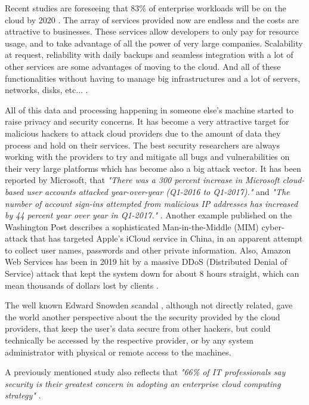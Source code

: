 Recent studies are foreseeing that 83{\%} of enterprise workloads will be on the cloud by 2020 \cite{cloud_statistic:1}. The array of services provided now are endless and the costs are attractive to businesses. These services allow developers to only pay for resource usage, and to take advantage of all the power of very large companies. Scalability at request, reliability with daily backups and seamless integration with a lot of other services are some advantages of moving to the cloud. And all of these functionalities without having to manage big infrastructures and a lot of servers, networks, disks, etc... \cite{cloud_benefits:1}.

All of this data and processing happening in someone else's machine started to raise privacy and security concerns. It has become a very attractive target for malicious hackers to attack cloud providers due to the amount of data they process and hold on their services. The best security researchers are always working with the providers to try and mitigate all bugs and vulnerabilities on their very large platforms which has become also a big attack vector. It has been reported by Microsoft, that \textit{"There was a 300 percent increase in Microsoft cloud-based user accounts attacked year-over-year (Q1-2016 to Q1-2017)."} and \textit{"The number of account sign-ins attempted from malicious IP addresses has increased by 44 percent year over year in Q1-2017."} \cite{cloud_attacks:1}. Another example published on the Washington Post describes a sophisticated Man-in-the-Middle (\gls{MIM}) cyber-attack that has targeted Apple’s iCloud service in China, in an apparent attempt to collect user names, passwords and other private information. Also, Amazon Web Services has been in 2019 hit by a massive \gls{DDoS} (Distributed Denial of Service) attack that kept the system down for about 8 hours straight, which can mean thousands of dollars lost by clients \cite{cloud_attacks:3}.

The well known Edward Snowden scandal \cite{snowden:1}, although not directly related, gave the world another perspective about the the security provided by the cloud providers, that keep the user's data secure from other hackers, but could technically be accessed by the respective provider, or by any system administrator with physical or remote access to the machines.

A previously mentioned study also reflects that \textit{"66{\%} of IT professionals say security is their greatest concern in adopting an enterprise cloud computing strategy"} \cite{cloud_statistic:1}.

